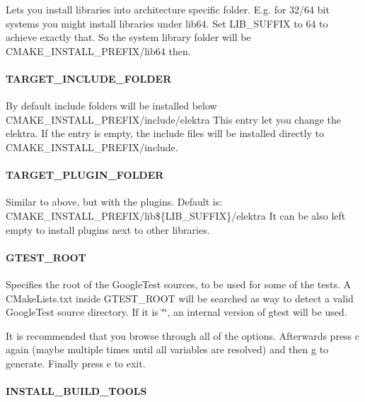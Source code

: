Lets you install libraries into architecture specific folder. E.\+g. for 32/64 bit systems you might install libraries under lib64. Set L\+I\+B\+\_\+\+S\+U\+F\+F\+I\+X to 64 to achieve exactly that. So the system library folder will be C\+M\+A\+K\+E\+\_\+\+I\+N\+S\+T\+A\+L\+L\+\_\+\+P\+R\+E\+F\+I\+X/lib64 then.

\paragraph*{T\+A\+R\+G\+E\+T\+\_\+\+I\+N\+C\+L\+U\+D\+E\+\_\+\+F\+O\+L\+D\+E\+R}

By default include folders will be installed below C\+M\+A\+K\+E\+\_\+\+I\+N\+S\+T\+A\+L\+L\+\_\+\+P\+R\+E\+F\+I\+X/include/elektra This entry let you change the elektra. If the entry is empty, the include files will be installed directly to C\+M\+A\+K\+E\+\_\+\+I\+N\+S\+T\+A\+L\+L\+\_\+\+P\+R\+E\+F\+I\+X/include.

\paragraph*{T\+A\+R\+G\+E\+T\+\_\+\+P\+L\+U\+G\+I\+N\+\_\+\+F\+O\+L\+D\+E\+R}

Similar to above, but with the plugins. Default is\+: C\+M\+A\+K\+E\+\_\+\+I\+N\+S\+T\+A\+L\+L\+\_\+\+P\+R\+E\+F\+I\+X/lib\$\{L\+I\+B\+\_\+\+S\+U\+F\+F\+I\+X\}/elektra It can be also left empty to install plugins next to other libraries.

\paragraph*{G\+T\+E\+S\+T\+\_\+\+R\+O\+O\+T}

Specifies the root of the Google\+Test sources, to be used for some of the tests. A C\+Make\+Lists.\+txt inside G\+T\+E\+S\+T\+\_\+\+R\+O\+O\+T will be searched as way to detect a valid Google\+Test source directory. If it is \char`\"{}\char`\"{}, an internal version of gtest will be used.

It is recommended that you browse through all of the options. Afterwards press c again (maybe multiple times until all variables are resolved) and then g to generate. Finally press e to exit.

\paragraph*{I\+N\+S\+T\+A\+L\+L\+\_\+\+B\+U\+I\+L\+D\+\_\+\+T\+O\+O\+L\+S}

